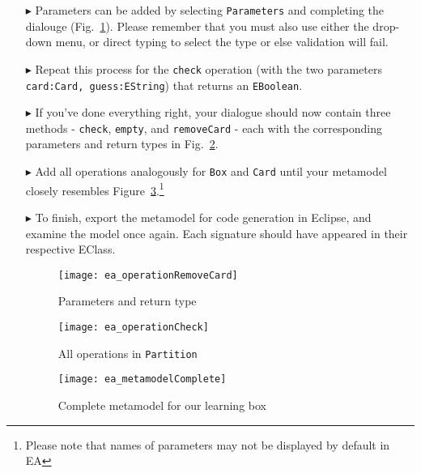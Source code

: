 \begin{enumerate}
\item[$\blacktriangleright$] Parameters can be added by selecting \texttt{Parameters} and
completing the dialouge (Fig.~\ref{ea:operation_parameters}). Please remember that you must also use either the drop-down menu, or direct typing to select the type or else validation
will fail.

\item[$\blacktriangleright$] Repeat this process for the \texttt{check} operation (with the two parameters \texttt{card:Card, guess:EString}) that returns an \texttt{EBoolean}. 

\item[$\blacktriangleright$] If you've done everything right, your dialogue should now contain three methods - \texttt{check}, \texttt{empty}, and
\texttt{removeCard} - each with the corresponding parameters and return types in Fig.~\ref{ea:operation_partition}.


\item[$\blacktriangleright$] Add all operations analogously for \texttt{Box} and \texttt{Card} until your metamodel closely resembles
Figure~\ref{ea:metamodel_complete}.\footnote{Please note that names of parameters may not be displayed by default in EA}

\item[$\blacktriangleright$] To finish, export the metamodel for code generation in Eclipse, and examine the model once again. Each signature should have
appeared in their respective EClass.

\newpage

\vspace*{1cm}

\begin{figure}[htbp]
	\centering
  \texttt{[image: ea\_operationRemoveCard]}
	\caption{Parameters and return type}
	\label{ea:operation_parameters}
\end{figure}

\vspace{1cm}

\begin{figure}[h!]
	\centering
  \texttt{[image: ea\_operationCheck]}
	\caption{All operations in \texttt{Partition}}
	\label{ea:operation_partition}
\end{figure}

\newpage


\begin{figure}[htbp]
	\centering
  \texttt{[image: ea\_metamodelComplete]}
\caption[Complete metamodel for our learning box.]{Complete metamodel for our learning box}
	\label{ea:metamodel_complete}
\end{figure}
\FloatBarrier


\end{enumerate}

